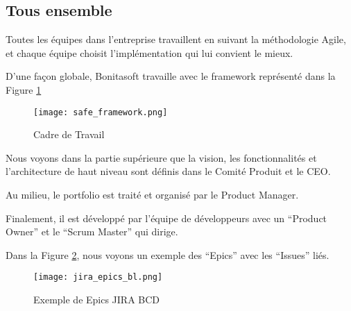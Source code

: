 \subsection{Tous ensemble}

Toutes les équipes dans l'entreprise travaillent en suivant la méthodologie Agile, et chaque équipe choisit l'implémentation qui lui convient le mieux.

D'une façon globale, Bonitasoft travaille avec le framework représenté dans la Figure \ref{frame_safe}

\begin{figure}[!ht]
\centering
\texttt{[image: safe\_framework.png]}
\caption{Cadre de Travail \cite{safe}}
\label{frame_safe}
\end{figure}

Nous voyons dans la partie supérieure que la vision, les fonctionnalités et l'architecture de haut niveau sont définis dans le Comité Produit et le CEO.

Au milieu, le portfolio est traité et organisé par le Product Manager.

Finalement, il est développé par l'équipe de développeurs avec un \enquote{Product Owner} et le \enquote{Scrum Master} qui dirige.

Dans la Figure \ref{fig:example_epic}, nous voyons un exemple des \enquote{Epics} avec les \enquote{Issues} liés.
\begin{figure}[!ht]
\centering
\texttt{[image: jira\_epics\_bl.png]}
\caption{Exemple de Epics JIRA BCD}
\label{fig:example_epic}
\end{figure}
